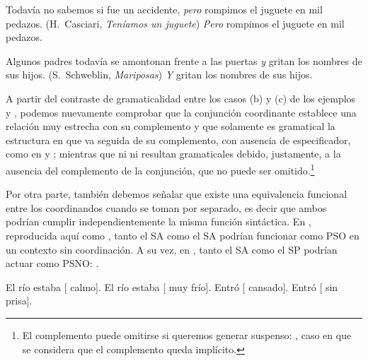 \begin{exe}
  \ex\label{ex:12-juguete}
    \begin{xlist}
      \ex Todavía no sabemos si fue un accidente, \textit{pero} rompimos el
          juguete en mil pedazos. (H.~Casciari, \textit{Teníamos un juguete})
      \ex\label{ex:12-juguete-c} \textit{Pero} rompimos el juguete en mil
          pedazos.
    \end{xlist}
  \ex\label{ex:12-padres}
    \begin{xlist}
      \ex Algunos padres todavía se amontonan frente a las puertas \textit{y}
          gritan los nombres de sus hijos. (S.~Schweblin, \textit{Mariposas})
      \ex\label{ex:12-padres-c} \textit{Y} gritan los nombres de sus hijos.
    \end{xlist}
\end{exe}

A partir del contraste de gramaticalidad entre los casos (b) y (c) de los
ejemplos  y , podemos nuevamente
comprobar que la conjunción coordinante establece una relación muy estrecha con
su complemento y que solamente es gramatical la estructura en que va seguida de
su complemento, con ausencia de especificador, como en  y
; mientras que ni  ni
 resultan gramaticales debido, justamente, a la ausencia
del complemento de la conjunción, que no puede ser omitido.\footnote{El
complemento puede omitirse si queremos generar suspenso: , caso en que se considera que el
complemento queda implícito.}

Por otra parte, también debemos señalar que existe una equivalencia funcional
entre los coordinandos cuando se toman por separado, es decir que ambos podrían
cumplir independientemente la misma función sintáctica. En ,
reproducida aquí como , tanto el SA  como el
SA  podrían funcionar como PSO en un contexto sin coordinación. A
su vez, en , tanto el SA  como el SP
 podrían actuar como PSNO: .

\begin{exe}
  \ex
    \begin{xlist}
      \ex\label{ex:12-equiv-a} El río estaba [ calmo]. El río estaba
          [ muy frío].
      \ex\label{ex:12-equiv-b} Entró [ cansado]. Entró
          [ sin prisa].
    \end{xlist}
\end{exe}

